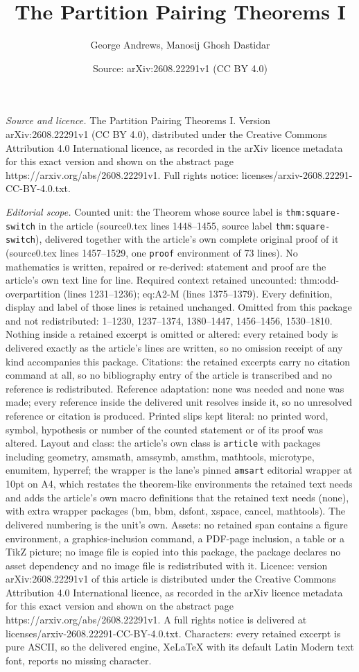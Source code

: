 \documentclass[10pt,a4paper]{amsart}
\title[The Partition Pairing Theorems I]{The Partition Pairing Theorems I}
\author{George Andrews, Manosij Ghosh Dastidar}
\date{Source: arXiv:2608.22291v1 (CC BY 4.0)}
\begin{document}
\maketitle

\noindent\emph{Source and licence.} The Partition Pairing Theorems I. Version arXiv:2608.22291v1 (CC BY 4.0), distributed under the Creative Commons Attribution 4.0 International licence, as recorded in the arXiv licence metadata for this exact version and shown on the abstract page https://arxiv.org/abs/2608.22291v1. Full rights notice: licenses/arxiv-2608.22291-CC-BY-4.0.txt.\par\smallskip

\noindent\textit{Editorial scope.} Counted unit: the Theorem whose source label is \texttt{thm:square-switch} in the article (source0.tex lines 1448--1455, source label \texttt{thm:square-switch}), delivered together with the article's own complete original proof of it (source0.tex lines 1457--1529, one \texttt{proof} environment of 73 lines). No mathematics is written, repaired or re-derived: statement and proof are the article's own text line for line. Required context retained uncounted: thm:odd-overpartition (lines 1231--1236); eq:A2-M (lines 1375--1379). Every definition, display and label of those lines is retained unchanged. Omitted from this package and not redistributed: 1--1230, 1237--1374, 1380--1447, 1456--1456, 1530--1810. Nothing inside a retained excerpt is omitted or altered: every retained body is delivered exactly as the article's lines are written, so no omission receipt of any kind accompanies this package. Citations: the retained excerpts carry no citation command at all, so no bibliography entry of the article is transcribed and no reference is redistributed. Reference adaptation: none was needed and none was made; every reference inside the delivered unit resolves inside it, so no unresolved reference or citation is produced. Printed slips kept literal: no printed word, symbol, hypothesis or number of the counted statement or of its proof was altered. Layout and class: the article's own class is \texttt{article} with packages including geometry, amsmath, amssymb, amsthm, mathtools, microtype, enumitem, hyperref; the wrapper is the lane's pinned \texttt{amsart} editorial wrapper at 10pt on A4, which restates the theorem-like environments the retained text needs and adds the article's own macro definitions that the retained text needs (none), with extra wrapper packages (bm, bbm, dsfont, xspace, cancel, mathtools). The delivered numbering is the unit's own. Assets: no retained span contains a figure environment, a graphics-inclusion command, a PDF-page inclusion, a table or a TikZ picture; no image file is copied into this package, the package declares no asset dependency and no image file is redistributed with it. Licence: version arXiv:2608.22291v1 of this article is distributed under the Creative Commons Attribution 4.0 International licence, as recorded in the arXiv licence metadata for this exact version and shown on the abstract page https://arxiv.org/abs/2608.22291v1. A full rights notice is delivered at licenses/arxiv-2608.22291-CC-BY-4.0.txt. Characters: every retained excerpt is pure ASCII, so the delivered engine, XeLaTeX with its default Latin Modern text font, reports no missing character.
\end{document}
